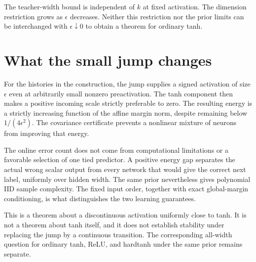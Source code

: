 \documentclass[11pt]{article}
\begin{document}
The teacher-width bound is independent of $k$ at fixed activation.
The dimension restriction grows as $\epsilon$ decreases. Neither this
restriction nor the prior limits can be interchanged with
$\epsilon\downarrow0$ to obtain a theorem for ordinary tanh.






\section{What the small jump changes}

For the histories in the construction, the jump supplies a signed
activation of size $\epsilon$ even at arbitrarily small nonzero
preactivation. The tanh component then makes a positive incoming scale
strictly preferable to zero. The resulting energy is a strictly
increasing function of the affine margin norm, despite remaining below
$1/(4\epsilon^2)$. The covariance certificate prevents a nonlinear
mixture of neurons from improving that energy.

The online error count does not come from computational limitations or
a favorable selection of one tied predictor. A positive energy gap
separates the actual wrong scalar output from every network that would
give the correct next label, uniformly over hidden width. The same
prior nevertheless gives polynomial IID sample complexity. The fixed
input order, together with exact global-margin conditioning, is what
distinguishes the two learning guarantees.

This is a theorem about a discontinuous activation uniformly close to
tanh. It is not a theorem about tanh itself, and it does not establish
stability under replacing the jump by a continuous transition. The
corresponding all-width question for ordinary tanh, ReLU, and hardtanh
under the same prior remains separate.
\end{document}
